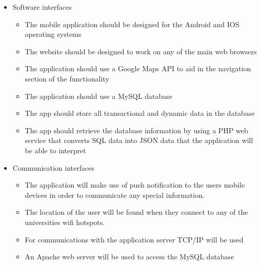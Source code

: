 \documentclass{article}
\begin{document}
\begin{itemize}
			\item Software interfaces
				\begin{itemize}
					\item The mobile application should be designed for the Android and IOS operating systems
					\item The website should be designed to work on any of the main web browsers
					\item The application should use a Google Maps API to aid in the navigation section of the functionality
					\item The application should use a MySQL database
					\item The app should store all transactional and dynamic data in the database
					\item The app should retrieve the database information by using a PHP web service that converts SQL data into JSON data that the application will be able to interpret
				\end{itemize}
				
			\item Communication interfaces
		\begin{itemize}
		\item The application will make use of push notification to the users mobile devices in order to communicate any special information. 

        \item The location of the user will be found when they connect to any of the universities wifi hotspots.

		\item For communications with the application server TCP/IP will be used

		\item An Apache web server will be used to access the MySQL database
		\end{itemize}
			\end{itemize}
		
\end{document}
